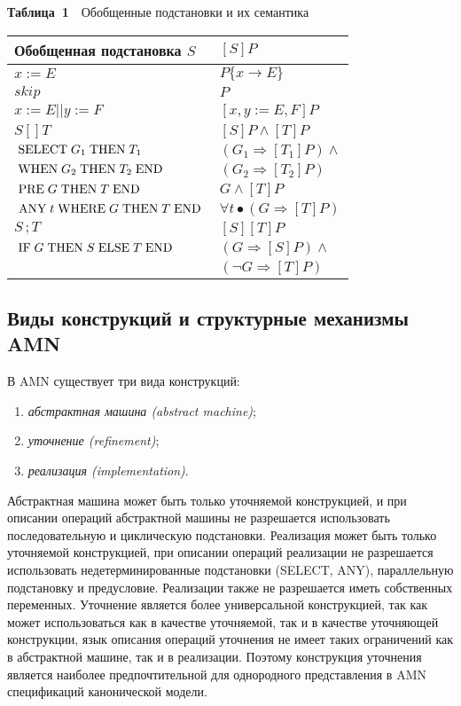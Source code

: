 \begin{multicols}{2}
{\small
\vspace*{6pt}
\begin{center}
\textbf{Таблица~1}\ \ Обобщенные подстановки и их семантика
\vspace*{2ex}

\begin{tabular}{|l|l|}
\hline
 Обобщенная подстановка $S$ & $[S]P$ \\
\hline
\hline
 $x:=E$ & $P\{x\rightarrow E\}$ \\
\hline
 $skip$ & $P$ \\
\hline
$x:=E||y:=F$ & $[x,y:=E,F]P$\\
\hline
 $S[]T$ & $[S]P\land [T]P$ \\
\hline
 $\;\mbox{SELECT}\; G_1 \;\mbox{THEN}\; T_1 $ & $(G_1\Rightarrow [T_1]P)\land $ \\
$\;\mbox{WHEN}\; G_2 \;\mbox{THEN}\; T_2\;\mbox{END}\;$&$(G_2\Rightarrow [T_2]P)$\\
\hline
 $\;\mbox{PRE}\; G \;\mbox{THEN}\; T \;\mbox{END}\;$ & $G\land [T]P$ \\
\hline
 $\;\mbox{ANY}\; t \;\mbox{WHERE}\; G \;\mbox{THEN}\; T \;\mbox{END}\;$ & $\forall t\bullet(G\Rightarrow [T]P)$ \\
\hline
 $S\,;T$ & $[S][T]P$\\
\hline
 $\;\mbox{IF}\; G\;\mbox{THEN}\; S \;\mbox{ELSE}\; T \;\mbox{END}\;$ & $(G\Rightarrow[S]P)\land $ \\
& $(\lnot G\Rightarrow [T]P)$\\
\hline
\end{tabular}
\vspace*{6pt}
\end{center}
}%

\subsection{Виды конструкций и структурные механизмы AMN}

В AMN существует три вида конструкций:
\begin{enumerate}[(1)]
\item {\it абстрактная машина (abstract machine)};
\item {\it уточнение (refinement)};
\item {\it реализация (implementation)}.
\end{enumerate}

Абстрактная машина может быть только уточняемой конструкцией,
и при описании операций абстрактной машины не разрешается
использовать последовательную и циклическую подстановки.
Реализация может быть только уточняемой конструкцией,
при описании операций реализации не разрешается использовать
недетерминированные подстановки (SELECT, ANY),
параллельную подстановку и предусловие.
Реализации также не разрешается иметь собственных переменных.
Уточнение является более универсальной конструкцией, так как
может использоваться как в качестве уточняемой, так и в качестве уточняющей
конструкции, язык описания операций уточнения не имеет таких ограничений
как в абстрактной машине, так и в реализации.
Поэтому конструкция уточнения является наиболее предпочтительной
для однородного представления в AMN спецификаций канонической модели.


\end{multicols}
